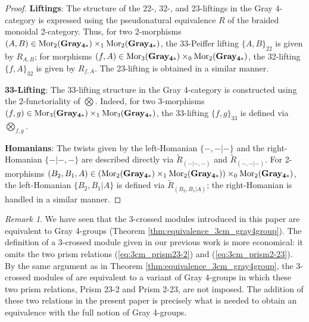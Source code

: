 \documentclass[11pt, reqno]{amsart} %
\newcommand{\mor}{{\mathop{\mathrm{Mor}}}}
\theoremstyle{definition}
\theoremstyle{remark}
\newtheorem{remark}[theorem]{Remark}
\numberwithin{equation}{section}
\begin{document}
\begin{proof}
\vspace{.5em}
\noindent
\textbf{Liftings}: The structure of the 22-, 32-, and 23-liftings in the Gray 4-category is expressed using the pseudonatural equivalence $R$ of the braided monoidal 2-category. Thus, for two 2-morphisms $(A, B) \in\mor_2({\bf Gray_{4*}})\times_1\mor_2({\bf Gray_{4*}})$, the 33-Peiffer lifting $\{A,B\}_{22}$ is given by $R_{A,B}$; for morphisms $(f,A) \in \mor_3({\bf Gray_{4*}})\times_0\mor_2({\bf Gray_{4*}})$, the 32-lifting $\{f,A\}_{32}$ is given by $R_{f,A}$. The 23-lifting is obtained in a similar manner.

\vspace{.5em}
\noindent
\textbf{33-Lifting}: The 33-lifting structure in the Gray 4-category is constructed using the 2-functoriality of $\bigotimes$. Indeed, for two 3-morphisms $(f,g)\in\mor_3({\bf Gray_{4*}})\times_1\mor_3({\bf Gray_{4*}})$, the 33-lifting $\{f,g\}_{33}$ is defined via $\bigotimes_{f,g}$.

\vspace{.5em}
\noindent
\textbf{Homanians}: The twists given by the left-Homanian $\{-,-|-\}$ and the right-Homanian $\{-|-,-\}$ are described directly via $\tilde{R}_{(-|-,-)}$ and $\tilde{R}_{(-,-|-)}$. For 2-morphisms $(B_2,B_1,A) \in {\lparen}\mor_2({\bf Gray_{4*}})\times_1\mor_2({\bf Gray_{4*}}){\rparen}\times_0\mor_2({\bf Gray_{4*}})$, the left-Homanian $\{B_2,B_1|A\}$ is defined via $\tilde{R}_{(B_2,B_1|A)}$; the right-Homanian is handled in a similar manner.


\end{proof}


\begin{remark}
We have seen that the 3-crossed modules introduced in this paper are equivalent to Gray 4-groups (Theorem \ref{thm:equivalence_3cm_gray4group}). The definition of a 3-crossed module given in our previous work \cite{Fukuda:2025} is more economical: it omits the two prism relations (\ref{eq:3cm_prism23-2}) and (\ref{eq:3cm_prism2-23}). By the same argument as in Theorem \ref{thm:equivalence_3cm_gray4group}, the 3-crossed modules of \cite{Fukuda:2025} are equivalent to a variant of Gray 4-groups in which these two prism relations, Prism 23-2 and Prism 2-23, are not imposed. The addition of these two relations in the present paper is precisely what is needed to obtain an equivalence with the full notion of Gray 4-groups.
\end{remark}
\end{document}
